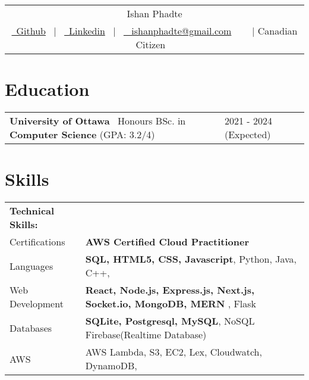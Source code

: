 \documentclass[a4paper,12pt]{article}
\begin{document}
\pagestyle{empty} 


\begin{tabularx}{\linewidth}{@{} C @{}}

\Huge{Ishan Phadte} \\[7pt]
\href{github.com/IshanPhadte776}{\raisebox{-0.10\height}\ Github} \ $|$ \ 
\href{linkedin.com/in/ishan-phadte}{\raisebox{-0.10\height}\ Linkedin} \ $|$ \ 
\href{ishanphadte@gmail.com}{\raisebox{-0.10\height} \ ishanphadte@gmail.com} \ 
\ {\raisebox{-0.10\height} \ $|$ Canadian Citizen} \ 

\end{tabularx}


\section{Education}
\begin{tabularx}{\linewidth}{@{}l X@{}}
\textbf{University of Ottawa} \
Honours BSc. in \textbf{Computer Science} (GPA: 3.2/4) & \hfill{2021 - 2024 (Expected)}
\end{tabularx}


\section{Skills}


\begin{tabularx}{\linewidth}{@{}l X@{}}
\textbf{Technical Skills:}\\
Certifications &  \normalsize{\textbf{AWS Certified Cloud Practitioner}}\\
Languages &  \normalsize{\textbf{SQL, HTML5, CSS, Javascript}, Python, Java, C++,}\\
Web Development &  \normalsize{\textbf{React, Node.js, Express.js, Next.js, Socket.io, MongoDB, MERN }, Flask}\\
Databases &  \normalsize{\textbf{SQLite, Postgresql, MySQL}, NoSQL Firebase(Realtime Database)}\\
AWS & \normalsize{AWS Lambda, S3, EC2, Lex, Cloudwatch, DynamoDB, } \\

\end{tabularx}
\end{document}

